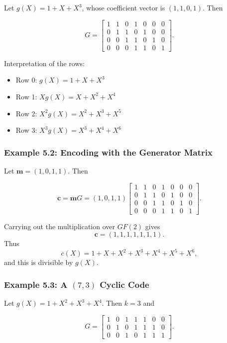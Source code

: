 \documentclass[11pt,oneside]{book}
\providecommand{\tightlist}{\setlength{\itemsep}{0pt}\setlength{\parskip}{0pt}}
\theoremstyle{plain}
\theoremstyle{definition}
\theoremstyle{remark}
\begin{document}
Let \(g(X)=1+X+X^3\), whose coefficient vector is \((1,1,0,1)\). Then

\[G = \begin{bmatrix}
1 & 1 & 0 & 1 & 0 & 0 & 0 \\
0 & 1 & 1 & 0 & 1 & 0 & 0 \\
0 & 0 & 1 & 1 & 0 & 1 & 0 \\
0 & 0 & 0 & 1 & 1 & 0 & 1
\end{bmatrix}.\]

Interpretation of the rows:

\begin{itemize}
\tightlist
\item
  Row 0: \(g(X)=1+X+X^3\)
\item
  Row 1: \(Xg(X)=X+X^2+X^4\)
\item
  Row 2: \(X^2g(X)=X^2+X^3+X^5\)
\item
  Row 3: \(X^3g(X)=X^3+X^4+X^6\)
\end{itemize}

\subsubsection{Example 5.2: Encoding with the Generator
Matrix}\label{example-5.2-encoding-with-the-generator-matrix}

Let \(\mathbf{m}=(1,0,1,1)\). Then

\[\mathbf{c} = \mathbf{m}G = (1,0,1,1)
\begin{bmatrix}
1 & 1 & 0 & 1 & 0 & 0 & 0 \\
0 & 1 & 1 & 0 & 1 & 0 & 0 \\
0 & 0 & 1 & 1 & 0 & 1 & 0 \\
0 & 0 & 0 & 1 & 1 & 0 & 1
\end{bmatrix}.\]

Carrying out the multiplication over \(GF(2)\) gives
\[\mathbf{c}=(1,1,1,1,1,1,1).\] Thus \[c(X)=1+X+X^2+X^3+X^4+X^5+X^6,\]
and this is divisible by \(g(X)\).

\subsubsection{\texorpdfstring{Example 5.3: A \((7,3)\) Cyclic
Code}{Example 5.3: A (7,3) Cyclic Code}}\label{example-5.3-a-73-cyclic-code}

Let \(g(X)=1+X^2+X^3+X^4\). Then \(k=3\) and

\[G = \begin{bmatrix}
1 & 0 & 1 & 1 & 1 & 0 & 0 \\
0 & 1 & 0 & 1 & 1 & 1 & 0 \\
0 & 0 & 1 & 0 & 1 & 1 & 1
\end{bmatrix}.\]
\end{document}
